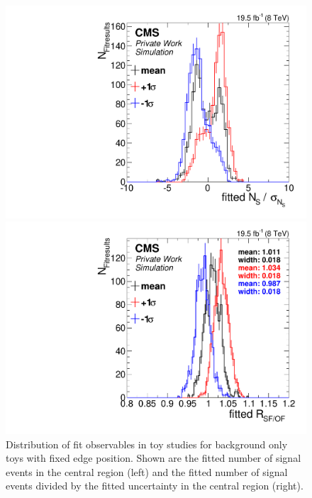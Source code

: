 \begin{figure}[hbp]
  \centering
  \begin{minipage}[t]{0.49\textwidth}
    \includegraphics[width=\textwidth]{plots/results/fit/toyResults/nS_systShift.pdf}
  \end{minipage}
  \begin{minipage}[t]{0.49\textwidth}
    \includegraphics[width=\textwidth]{plots/results/fit/toyResults/rSFOF_systShift.pdf}
  \end{minipage}

  \caption{Distribution of fit observables in toy studies for background only toys with fixed edge position. Shown are the fitted number of signal events in the central region (left) and the fitted number of signal events divided by the fitted uncertainty in the central region (right).}
  \label{fig:toys:systShift}
\end{figure}
